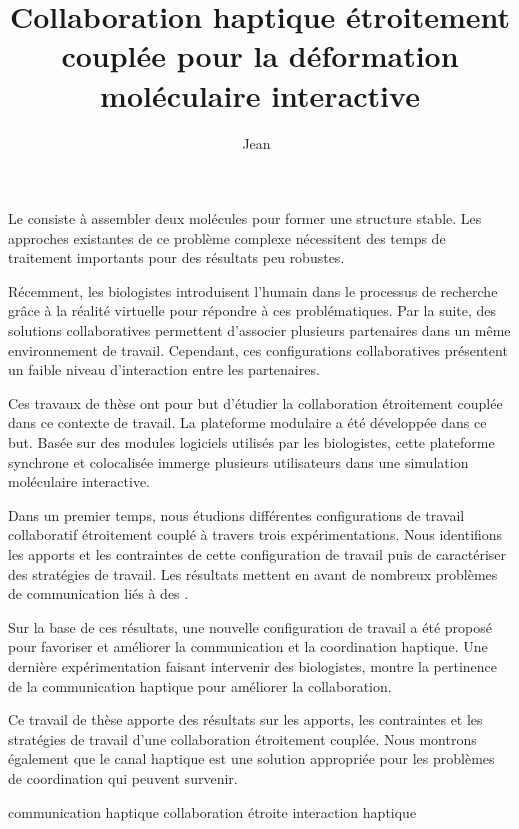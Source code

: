 \documentclass[myfrancais,ngerman,english,french]{mythesis}
\title{Collaboration haptique étroitement couplée pour la déformation moléculaire interactive}
\author{Jean~\myname{Simard}}
\date{\mydate[datestyle=long]{01/02/2012}}
\date{\myemph{<à définir>}}
\begin{document}
	\frontmatter
	\maketitle
	\mytoc
	\mylof
	\mylot
	\begin{myabstract}[french]
		Le  consiste à assembler deux molécules pour former une structure stable.
		Les approches existantes de ce problème complexe nécessitent des temps de traitement importants pour des résultats peu robustes.

		Récemment, les biologistes introduisent l'humain dans le processus de recherche grâce à la réalité virtuelle pour répondre à ces problématiques.
		Par la suite, des solutions collaboratives permettent d'associer plusieurs partenaires dans un même environnement de travail.
		Cependant, ces configurations collaboratives présentent un faible niveau d'interaction entre les partenaires.

		Ces travaux de thèse ont pour but d'étudier la collaboration étroitement couplée dans ce contexte de travail.
		La plateforme modulaire \myShaddock a été développée dans ce but.
		Basée sur des modules logiciels utilisés par les biologistes, cette plateforme synchrone et colocalisée immerge plusieurs utilisateurs dans une simulation moléculaire interactive.

		Dans un premier temps, nous étudions différentes configurations de travail collaboratif étroitement couplé à travers trois expérimentations.
		Nous identifions les apports et les contraintes de cette configuration de travail puis de caractériser des stratégies de travail.
		Les résultats mettent en avant de nombreux problèmes de communication liés à des .

		Sur la base de ces résultats, une nouvelle configuration de travail a été proposé pour favoriser et améliorer la communication et la coordination haptique.
		Une dernière expérimentation faisant intervenir des biologistes, montre la pertinence de la communication haptique pour améliorer la collaboration.

		Ce travail de thèse apporte des résultats sur les apports, les contraintes et les stratégies de travail d'une collaboration étroitement couplée.
		Nous montrons également que le canal haptique est une solution appropriée pour les problèmes de coordination qui peuvent survenir.
		\begin{mykeywords}
			\mykeyword {}
			\mykeyword communication haptique
			\mykeyword collaboration étroite
			\mykeyword interaction haptique
		\end{mykeywords}
	\end{myabstract}
\end{document}
